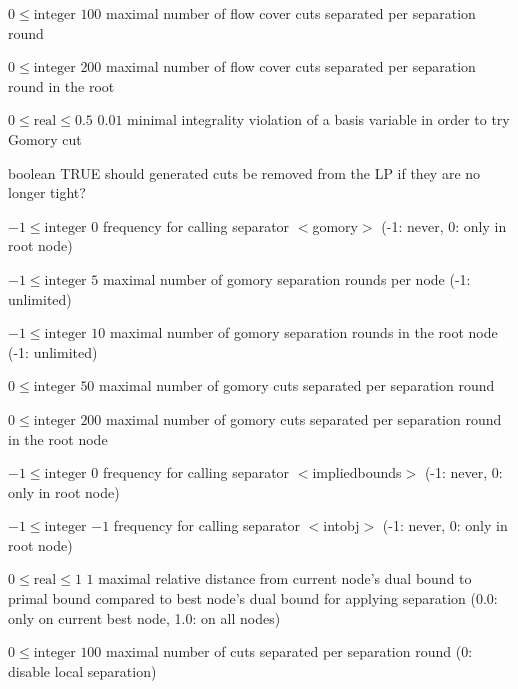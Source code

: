 %
{$0\leq\textrm{integer}$}%
{$100$}%
{maximal number of flow cover cuts separated per separation round}%
{}

%
{$0\leq\textrm{integer}$}%
{$200$}%
{maximal number of flow cover cuts separated per separation round in the root}%
{}

%
{$0\leq\textrm{real}\leq0.5$}%
{$0.01$}%
{minimal integrality violation of a basis variable in order to try Gomory cut}%
{}

%
{boolean}%
{TRUE}%
{should generated cuts be removed from the LP if they are no longer tight?}%
{}

%
{$-1\leq\textrm{integer}$}%
{$0$}%
{frequency for calling separator $<$gomory$>$ (-1: never, 0: only in root node)}%
{}

%
{$-1\leq\textrm{integer}$}%
{$5$}%
{maximal number of gomory separation rounds per node (-1: unlimited)}%
{}

%
{$-1\leq\textrm{integer}$}%
{$10$}%
{maximal number of gomory separation rounds in the root node (-1: unlimited)}%
{}

%
{$0\leq\textrm{integer}$}%
{$50$}%
{maximal number of gomory cuts separated per separation round}%
{}

%
{$0\leq\textrm{integer}$}%
{$200$}%
{maximal number of gomory cuts separated per separation round in the root node}%
{}

%
{$-1\leq\textrm{integer}$}%
{$0$}%
{frequency for calling separator $<$impliedbounds$>$ (-1: never, 0: only in root node)}%
{}

%
{$-1\leq\textrm{integer}$}%
{$-1$}%
{frequency for calling separator $<$intobj$>$ (-1: never, 0: only in root node)}%
{}

%
{$0\leq\textrm{real}\leq1$}%
{$1$}%
{maximal relative distance from current node's dual bound to primal bound compared to best node's dual bound for applying separation (0.0: only on current best node, 1.0: on all nodes)}%
{}

%
{$0\leq\textrm{integer}$}%
{$100$}%
{maximal number of cuts separated per separation round (0: disable local separation)}%
{}

